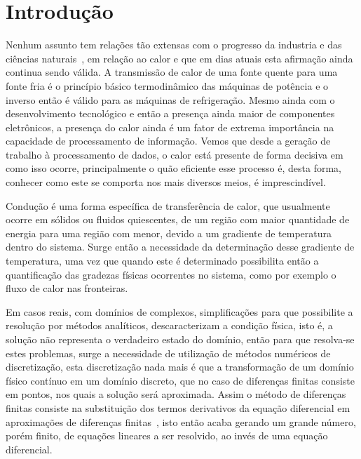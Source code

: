 \documentclass[
	12pt,				  %
	openright,		%
	twoside,			%
	a4paper,			%
	chapter=TITLE,		    %
	english,			%
	brazil				%
	]{abntex2}
\begin{document}
\chapter{Introdução}
%
Nenhum assunto tem relações tão extensas com o progresso da industria e das
ciências naturais~\cite{fourier1878}, em relação ao calor e que em dias
atuais esta afirmação ainda continua sendo válida. A transmissão de calor de
uma fonte quente para uma fonte fria é o princípio básico termodinâmico das
máquinas de potência e o inverso então é válido para as máquinas de
refrigeração. Mesmo ainda com o desenvolvimento tecnológico e então a presença
ainda maior de componentes eletrônicos, a presença do calor ainda é um fator de
extrema importância na capacidade de processamento de informação.  Vemos que
desde a geração de trabalho à processamento de dados, o calor está presente de
forma decisiva em como isso ocorre, principalmente o quão eficiente esse
processo é, desta forma, conhecer como este se comporta nos mais diversos
meios, é imprescindível.

Condução é uma forma específica de transferência de calor, que usualmente
ocorre em sólidos ou fluidos quiescentes, de um região com maior quantidade de
energia para uma região com menor, devido a um gradiente de
temperatura dentro do sistema. Surge então a necessidade da determinação desse
gradiente de temperatura, uma vez que quando este é determinado possibilita
então a quantificação das gradezas físicas ocorrentes no sistema, como por
exemplo o fluxo de calor nas fronteiras.

Em casos reais, com domínios de complexos, simplificações para que possibilite
a resolução por métodos analíticos, descaracterizam a condição física, isto é,
a solução não representa o verdadeiro estado do domínio, então para que
resolva-se estes problemas, surge a necessidade de utilização de métodos
numéricos de discretização, esta discretização nada mais é que a transformação
de um domínio físico contínuo em um domínio discreto, que no caso de diferenças
finitas consiste em pontos, nos quais a solução será aproximada. Assim o método
de diferenças finitas consiste na substituição dos termos derivativos da
equação diferencial em aproximações de diferenças finitas~\cite{leveque2007},
isto então acaba gerando um grande número, porém finito, de equações lineares a
ser resolvido, ao invés de uma equação diferencial.
\end{document}
